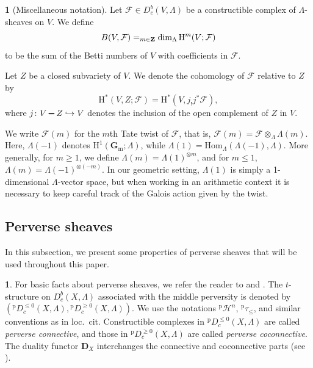 \documentclass[english]{smfart}
\let\sum\relax\DeclareMathSymbol{\sum}{\mathop}{fourier}{80}
\renewcommand{\setminus}{\mathbin{\rule[0.2em]{0.67em}{0.12em}}}%
\renewcommand{\mathbb}{\mathbf}
\renewcommand{\leq}{\leqslant}
\renewcommand{\geq}{\geqslant}
\theoremstyle{remark}
\theoremstyle{plain}
\theoremstyle{definition}
\numberwithin{equation}{remark}
\theoremstyle{void}
\newtheorem{situation}[remark]{}
\begin{document}
\begin{situation}[Miscellaneous notation]
Let \(\mathcal{F} \in D^{b}_{c}(V,\Lambda)\) be a constructible
complex of \(\Lambda\)-sheaves on \(V\).  We define
\[
B(V,\mathcal{F}) = \sum_{m \in \mathbb{Z}} \dim_{\Lambda}
\mathrm{H}^{m}(V;\mathcal{F})
\]
to be the sum of the Betti numbers of \(V\) with coefficients
in \(\mathcal{F}\).

Let \(Z\) be a closed subvariety of \(V\).  We denote the cohomology
of \(\mathcal{F}\) relative to \(Z\) by
\[
\mathrm{H}^{\ast}(V, Z; \mathcal{F}) = \mathrm{H}^{\ast}(V, j_{!}j^{\ast}\mathcal{F}),
\]
where \(j\colon V \setminus Z \hookrightarrow V\) denotes the
inclusion of the open complement of \(Z\) in \(V\).

We write \(\mathcal{F}(m)\) for the \(m\)th Tate twist of
\(\mathcal{F}\), that is,
\(\mathcal{F}(m) = \mathcal{F} \otimes_{\Lambda} \Lambda(m)\).  Here,
\(\Lambda(-1)\) denotes
\(\mathrm{H}^{1}(\mathbb{G}_{\mathrm{m}};\Lambda)\), while
\(\Lambda(1) = \mathrm{Hom}_{\Lambda}(\Lambda(-1),\Lambda)\).  More
generally, for \(m \geq 1\), we define
\(\Lambda(m) = \Lambda(1)^{\otimes m}\), and for \(m \leq 1\),
\(\Lambda(m) = \Lambda(-1)^{\otimes (-m)}\).  In our geometric
setting, \(\Lambda(1)\) is simply a 1-dimensional \(\Lambda\)-vector
space, but when working in an arithmetic context it is necessary to
keep careful track of the Galois action given by the twist.
\end{situation}

\subsection{Perverse sheaves}
In this subsection, we present some properties of perverse sheaves
that will be used throughout this paper.

\begin{situation}
For basic facts about perverse sheaves, we refer the reader to
\cite{bbd} and
\cite{kiehl-weissauer_weil-conjectures-perverse-sheaves}.  The
\(t\)-structure on \(D^b_c(X, \Lambda)\) associated with the middle
perversity is denoted by
\(({}^{\mathrm{p}}D^{\leq0}_c(X,\Lambda),
{}^{\mathrm{p}}D^{\geq0}_c(X,\Lambda))\).  We use the notations
\({}^{\mathrm{p}}\mathcal{H}^n\), \({}^{\mathrm{p}}\tau_{\leq}\), and
similar conventions as in loc.~cit.  Constructible complexes in
\({}^{\mathrm{p}}D^{\leq0}_c(X, \Lambda)\) are called \emph{perverse
  connective}, and those in \({}^{\mathrm{p}}D^{\geq0}_c(X, \Lambda)\)
are called \emph{perverse coconnective}.  The duality functor
\(\mathbb{D}_{X}\) interchanges the connective and coconnective parts
(see \cite[2.2 and 4.3.1]{bbd}).
\end{situation}
\end{document}
